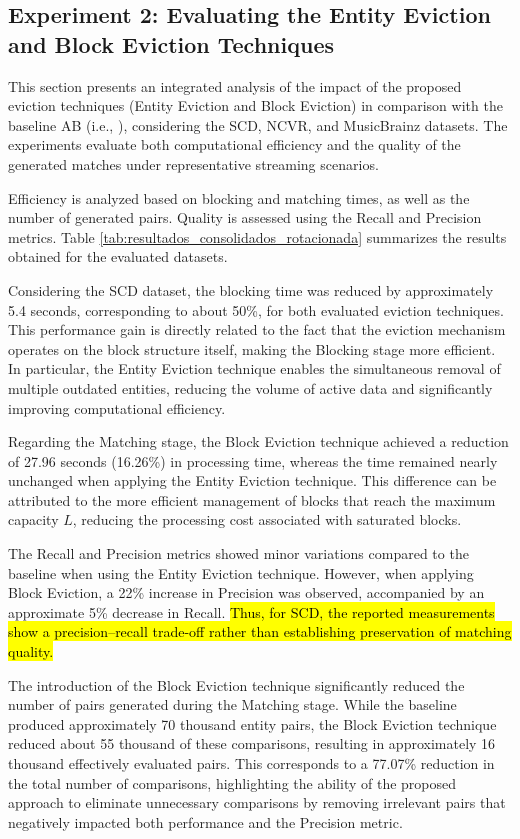 \documentclass{ieeeaccess}
\begin{document}
\subsection{Experiment 2: Evaluating the Entity Eviction and Block Eviction Techniques}
This section presents an integrated analysis of the impact of the proposed eviction techniques (Entity Eviction and Block Eviction) in comparison with the baseline AB (i.e., \cite{10.1109/TKDE.2024.3361022}), considering the SCD, NCVR, and MusicBrainz datasets. The experiments evaluate both computational efficiency and the quality of the generated matches under representative streaming scenarios.

Efficiency is analyzed based on blocking and matching times, as well as the number of generated pairs. Quality is assessed using the Recall and Precision metrics. Table \ref{tab:resultados_consolidados_rotacionada} summarizes the results obtained for the evaluated datasets.

Considering the SCD dataset, the blocking time was reduced by approximately 5.4 seconds, corresponding to about 50\%, for both evaluated eviction techniques. This performance gain is directly related to the fact that the eviction mechanism operates on the block structure itself, making the Blocking stage more efficient. In particular, the Entity Eviction technique enables the simultaneous removal of multiple outdated entities, reducing the volume of active data and significantly improving computational efficiency.

Regarding the Matching stage, the Block Eviction technique achieved a reduction of 27.96 seconds (16.26\%) in processing time, whereas the time remained nearly unchanged when applying the Entity Eviction technique. This difference can be attributed to the more efficient management of blocks that reach the maximum capacity \(L\), reducing the processing cost associated with saturated blocks.

The Recall and Precision metrics showed minor variations compared to the baseline when using the Entity Eviction technique. However, when applying Block Eviction, a 22\% increase in Precision was observed, accompanied by an approximate 5\% decrease in Recall. \hl{Thus, for SCD, the reported measurements show a precision--recall trade-off rather than establishing preservation of matching quality.}

The introduction of the Block Eviction technique significantly reduced the number of pairs generated during the Matching stage. While the baseline produced approximately 70 thousand entity pairs, the Block Eviction technique reduced about 55 thousand of these comparisons, resulting in approximately 16 thousand effectively evaluated pairs. This corresponds to a 77.07\% reduction in the total number of comparisons, highlighting the ability of the proposed approach to eliminate unnecessary comparisons by removing irrelevant pairs that negatively impacted both performance and the Precision metric.
\end{document}
